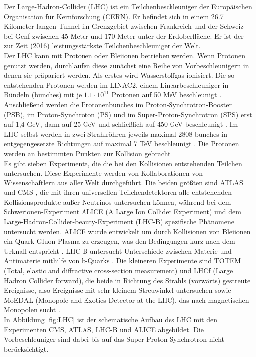 Der Large-Hadron-Collider (LHC) ist ein Teilchenbeschleuniger der Europ\"aischen Organisation f\"ur Kernforschung (CERN). Er befindet sich in einem \num{26,7} Kilometer langen Tunnel im Grenzgebiet zwischen Frankreich und der Schweiz bei Genf zwischen \num{45} Meter und \num{170} Meter unter der Erdoberfl\"ache. Er ist der zur Zeit (\num{2016}) leistungsst\"arkste Teilchenbeschleuniger der Welt.\\
Der LHC kann mit Protonen oder Bleiionen betrieben werden. Wenn Protonen genutzt werden, durchlaufen diese zun\"achst eine Reihe von Vorbeschleunigern in denen sie pr\"apariert werden. Als erstes wird Wasserstoffgas ionisiert. Die so entstehenden Protonen werden im LINAC2, einem Linearbeschleuniger in B\"undeln (bunches) mit je $\num{1,1}\cdot\num{10}^{\num{11}}$ Protonen auf 50 MeV beschleunigt \cite{O'Luanaigh:1997427}. Anschlie\ss end werden die Protonenbunches im Proton-Synchrotron-Booster (PSB), im Proton-Synchroton (PS) und im Super-Proton-Synchrotron (SPS) erst auf 1,4 GeV, dann auf 25 GeV und schlie\ss lich auf 450 GeV beschleunigt \cite{O'Luanaigh:1997193}. Im LHC selbst werden in zwei Strahlr\"ohren jeweils maximal 2808 bunches in entgegengesetzte Richtungen auf maximal 7 TeV beschleunigt \cite{Lefevre:1165534}. Die Protonen werden an bestimmten Punkten zur Kollision gebracht. \\
Es gibt sieben Experimente, die die bei den Kollisionen entstehenden Teilchen untersuchen. Diese Experimente werden von Kollaborationen von Wissenschaftlern aus aller Welt durchgef\"uhrt. Die beiden gr\"o\ss ten sind ATLAS \cite{ATLAS} und CMS \cite{CMS}, die mit ihren universellen Teilchendetektoren alle entstehenden Kollisionsprodukte au\ss er Neutrinos untersuchen k\"onnen, w\"ahrend bei dem Schwerionen-Experiment ALICE (A Large Ion Collider Experiment) und dem Large-Hadron-Collider-beauty-Experiment (LHC-B) spezifische Ph\"anomene untersucht werden. ALICE wurde entwickelt um durch Kollisionen von Bleiionen ein Quark-Gluon-Plasma zu erzeugen, was den Bedingungen kurz nach dem Urknall entspricht \cite{ALICE}. LHC-B untersucht Unterschiede zwischen Materie und Antimaterie mithilfe von b-Quarks \cite{LHCb}. Die kleineren Experimente sind TOTEM (Total, elastic and diffractive cross-section measurement) und LHCf (Large Hadron Collider forward), die beide in Richtung des Strahls (\glqq vorw\"arts\grqq) gestreute Ereignisse, also Ereignisse mit sehr kleinem Streuwinkel untersuchen \cite{LHCf,TOTEM} sowie MoEDAL (Monopole and Exotics Detector at the LHC), das nach magnetischen Monopolen sucht \cite{MoEDAL}.\\%
In Abbildung \ref{fig:LHC} ist der schematische Aufbau des LHC mit den Experimenten CMS, ATLAS, LHC-B und ALICE abgebildet. Die Vorbeschleuniger sind dabei bis auf das Super-Proton-Synchrotron nicht ber\"ucksichtigt.

